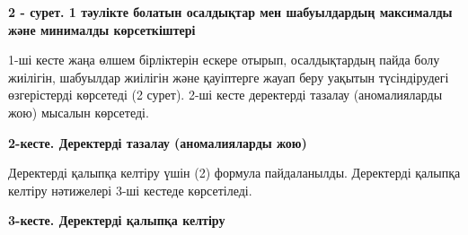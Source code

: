 {\bfseries 2 - сурет. 1 тәулікте болатын осалдықтар мен шабуылдардың
максималды және минималды көрсеткіштері}

1-ші кесте жаңа өлшем бірліктерін ескере отырып, осалдықтардың пайда
болу жиілігін, шабуылдар жиілігін және қауіптерге жауап беру уақытын
түсіндірудегі өзгерістерді көрсетеді (2 сурет). 2-ші кесте деректерді
тазалау (аномалияларды жою) мысалын көрсетеді.

{\bfseries 2-кесте. Деректерді тазалау (аномалияларды жою)}


Деректерді қалыпқа келтіру үшін (2) формула пайдаланылды. Деректерді
қалыпқа келтіру нәтижелері 3-ші кестеде көрсетіледі.

{\bfseries 3-кесте. Деректерді қалыпқа келтіру}

